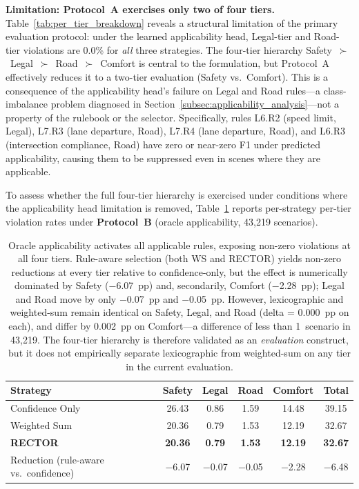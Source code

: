 \noindent\textbf{Limitation: Protocol~A exercises only two of four tiers.}
Table~\ref{tab:per_tier_breakdown} reveals a structural limitation of the primary evaluation protocol: under the learned applicability head, Legal-tier and Road-tier violations are 0.0\% for \emph{all} three strategies.  The four-tier hierarchy Safety~$\succ$~Legal~$\succ$~Road~$\succ$~Comfort is central to the formulation, but Protocol~A effectively reduces it to a two-tier evaluation (Safety vs.\ Comfort).  This is a consequence of the applicability head's failure on Legal and Road rules---a class-imbalance problem diagnosed in Section~\ref{subsec:applicability_analysis}---not a property of the rulebook or the selector.  Specifically, rules L6.R2 (speed limit, Legal), L7.R3 (lane departure, Road), L7.R4 (lane departure, Road), and L6.R3 (intersection compliance, Road) have zero or near-zero F1 under predicted applicability, causing them to be suppressed even in scenes where they are applicable.

To assess whether the full four-tier hierarchy is exercised under conditions where the applicability head limitation is removed, Table~\ref{tab:per_tier_oracle} reports per-strategy per-tier violation rates under \textbf{Protocol~B} (oracle applicability, 43{,}219 scenarios).

\begin{table}[t]
\centering
\caption{Per-Tier Violation Rates by Selection Strategy (\%, Protocol~B, Oracle Applicability, 43{,}219 Scenarios)}
\label{tab:per_tier_oracle}
\setlength{\tabcolsep}{3pt}
\begin{tabular}{lccccc}
\toprule
\textbf{Strategy} & \textbf{Safety} & \textbf{Legal} & \textbf{Road} & \textbf{Comfort} & \textbf{Total} \\
\midrule
Confidence Only & 26.43 & 0.86 & 1.59 & 14.48 & 39.15 \\
Weighted Sum    & 20.36 & 0.79 & 1.53 & 12.19 & 32.67 \\
\textbf{RECTOR} & \textbf{20.36} & \textbf{0.79} & \textbf{1.53} & \textbf{12.19} & \textbf{32.67} \\
\midrule
Reduction (rule-aware vs.\ confidence) & $-$6.07 & $-$0.07 & $-$0.05 & $-$2.28 & $-$6.48 \\
\bottomrule
\end{tabular}
\vspace{1mm}
\caption*{\footnotesize Oracle applicability activates all applicable rules, exposing non-zero violations at all four tiers.  Rule-aware selection (both WS and RECTOR) yields non-zero reductions at every tier relative to confidence-only, but the effect is numerically dominated by Safety ($-$6.07~pp) and, secondarily, Comfort ($-$2.28~pp); Legal and Road move by only $-$0.07~pp and $-$0.05~pp.  However, lexicographic and weighted-sum remain identical on Safety, Legal, and Road (delta = 0.000~pp on each), and differ by 0.002~pp on Comfort---a difference of less than 1~scenario in 43{,}219.  The four-tier hierarchy is therefore validated as an \emph{evaluation} construct, but it does not empirically separate lexicographic from weighted-sum on any tier in the current evaluation.}
\end{table}

